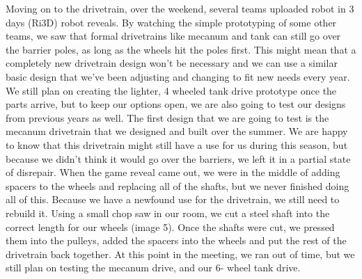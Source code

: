 Moving on to the drivetrain, over the weekend, several teams uploaded robot in 3 days (Ri3D) robot reveals. By watching the simple prototyping of some other teams, we saw that formal drivetrains like mecanum and tank can still go over the barrier poles, as long as the wheels hit the poles first. This might mean that a completely new drivetrain design won’t be necessary and we can use a similar basic design that we’ve been adjusting and changing to fit new needs every year. We still plan on creating the lighter, 4 wheeled tank drive prototype once the parts arrive, but to keep our options open, we are also going to test our designs from previous years as well.
The first design that we are going to test is the mecanum drivetrain that we designed and built over the summer. We are happy to know that this drivetrain might still have a use for us during this season, but because we didn’t think it would go over the barriers, we left it in a partial state of disrepair. When the game reveal came out, we were in the middle of adding spacers to the wheels and replacing all of the shafts, but we never finished doing all of this. Because we have a newfound use for the drivetrain, we still need to rebuild it. Using a small chop saw in our room, we cut a steel shaft into the correct length for our wheels (image 5). Once the shafts were cut, we pressed them into the pulleys, added the spacers into the wheels and put the rest of the drivetrain back together. At this point in the meeting, we ran out of time, but we still plan on testing the mecanum drive, and our 6- wheel tank drive.


